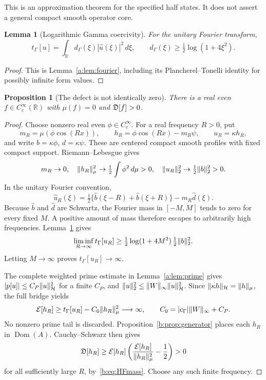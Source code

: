 \documentclass[11pt,a4paper]{article}
\numberwithin{equation}{section}
\newtheorem{proposition}[theorem]{Proposition}
\newtheorem{lemma}[theorem]{Lemma}
\theoremstyle{definition}\newtheorem{definition}[theorem]{Definition}
\theoremstyle{remark}\newtheorem{remark}[theorem]{Remark}
\newcommand{\R}{\mathbb R}\newcommand{\C}{\mathbb C}\newcommand{\N}{\mathbb N}
\newcommand{\E}{\mathcal E}\newcommand{\D}{\mathcal D}
\newcommand{\Hh}{\mathcal H}\newcommand{\Hw}{\mathcal H}
\newcommand{\tg}{t_\Gamma}\newcommand{\cg}{c_\Gamma}
\newcommand{\dom}{\operatorname{Dom}}\newcommand{\Var}{\operatorname{Var}}
\begin{document}
This is an approximation theorem for the specified half states. It does not assert a general compact smooth operator core.

\begin{lemma}[Logarithmic Gamma coercivity]\label{b:lem:fourier}
For the unitary Fourier transform,
\begin{equation}\label{b:eq:multiplier}
 \tg[u]=\int_\R d_\Gamma(\xi)|\widehat u(\xi)|^2\,d\xi,
 \qquad d_\Gamma(\xi)\ge\tfrac12\log(1+4\xi^2).
\end{equation}
\end{lemma}
\begin{proof}
This is Lemma~\ref{a:lem:fourier}, including its Plancherel--Tonelli identity for possibly infinite form values.
\end{proof}

\begin{proposition}[The defect is not identically zero]\label{b:prop:positive}
There is a real even $f\in C_c^\infty(\R)$ with $\mu(f)=0$ and $\mathfrak D[f]>0$.
\end{proposition}
\begin{proof}
Choose nonzero real even $\phi\in C_c^\infty$. For a real frequency $R>0$, put
\[
 m_R=\mu(\phi\cos(Rx)),\qquad h_R=\phi\cos(Rx)-m_R\psi,
 \qquad u_R=\kappa h_R,
\]
and write $b=\kappa\phi$, $d=\kappa\psi$. These are centered compact smooth profiles with fixed compact support. Riemann--Lebesgue gives
\begin{equation}\label{b:eq:HFmass}
 m_R\to0,\quad
 \lVert h_R\rVert_\mu^2\to\tfrac12\int\phi^2\,d\mu>0,\quad
 \lVert u_R\rVert_2^2\to\tfrac12\lVert b\rVert_2^2>0.
\end{equation}
In the unitary Fourier convention,
\[
 \widehat u_R(\xi)=\tfrac12\{\widehat b(\xi-R)+\widehat b(\xi+R)\}
                         -m_R\widehat d(\xi).
\]
Because $\widehat b$ and $\widehat d$ are Schwartz, the Fourier mass in $[-M,M]$ tends to zero for every fixed $M$. A positive amount of mass therefore escapes to arbitrarily high frequencies. Lemma~\ref{b:lem:fourier} gives
\[
 \liminf_{R\to\infty}\tg[u_R]
 \ge\tfrac12\log(1+4M^2)\,\tfrac12\norm b_2^2.
\]
Letting $M\to\infty$ proves $\tg[u_R]\to\infty$.

The complete weighted prime estimate in Lemma~\ref{a:lem:prime} gives
$|p[u]|\le C_P\norm u_{\Hh}^2$ for a finite $C_P$, and
$\norm u_2^2\le\norm W_\infty\norm u_{\Hh}^2$. Since $\norm{\kappa h}_{\Hh}=\norm h_\mu$, the full bridge yields
\[
 \E[h_R]\ge\tg[u_R]-C_0\norm{h_R}_\mu^2\longrightarrow\infty,
 \qquad C_0=|\cg|\norm W_\infty+C_P.
\]
No nonzero prime tail is discarded. Proposition~\ref{b:prop:generator} places each $h_R$ in $\dom(A)$. Cauchy--Schwarz then gives
\[
 \Def[h_R]\ge\E[h_R]
       \left(\frac{\E[h_R]}{\norm{h_R}_\mu^2}-\frac12\right)>0
\]
for all sufficiently large $R$, by~\eqref{b:eq:HFmass}. Choose any such finite frequency.
\end{proof}
\end{document}
